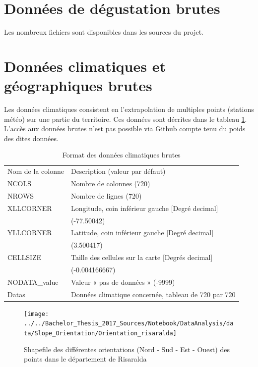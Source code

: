 \section{Données de dégustation brutes}
Les nombreux fichiers sont disponibles dans les sources du projet. 

\section{Données climatiques et géographiques brutes}
Les données climatiques consistent en l'extrapolation de multiples points (stations météo) sur une partie du territoire. Ces données sont décrites dans le tableau \ref{ClimaticRawData}. L'accès aux données brutes n'est pas possible via Github compte tenu du poids des dites données. 


\begin{table}[H]
	\centering
	\caption{Format des données climatiques brutes}
	\label{ClimaticRawData}
	\begin{tabular}{ll}
		Nom de la colonne & Description (valeur par défaut)                       \\
		NCOLS             & Nombre de colonnes (720)                              \\
		NROWS             & Nombre de lignes (720)                                \\
		XLLCORNER         & Longitude, coin inférieur gauche {[}Degré decimal{]}  \\
		& (-77.50042)                                           \\
		YLLCORNER         & Latitude, coin inférieur gauche {[}Degré decimal{]}   \\
		& (3.500417)                                              \\
		CELLSIZE          & Taille des cellules sur la carte {[}Degrés decimal{]} \\
		& (-0.004166667)                                          \\
		NODATA\_value     & Valeur « pas de données » (-9999)                     \\
		Datas             & Données climatique concernée, tableau de 720 par 720                                                     
	\end{tabular}
\end{table}





\begin{figure}[H]
	\centering
	\caption{Shapefile des différentes orientations (Nord - Sud - Est - Ouest) des points dans le département de Risaralda}
	\label{fig:orientationrisaralda}
	\texttt{[image: ../../Bachelor\_Thesis\_2017\_Sources/Notebook/DataAnalysis/data/Slope\_Orientation/Orientation\_risaralda]}
	
\end{figure}


